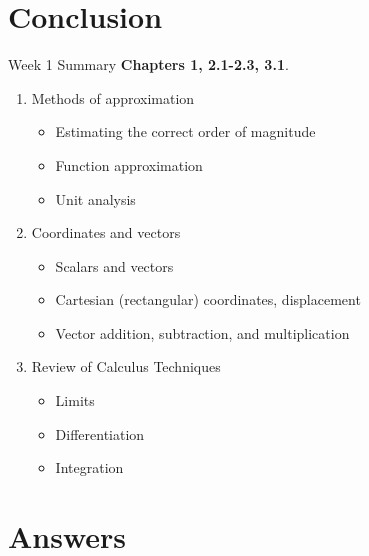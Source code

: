\documentclass{beamer}
\begin{document}
\section{Conclusion}

\begin{frame}{Week 1 Summary}
\textbf{Chapters 1, 2.1-2.3, 3.1}.
\begin{enumerate}
\item Methods of approximation
\begin{itemize}
\item \alert{Estimating} the correct order of magnitude
\item \alert{Function} approximation
\item \alert{Unit analysis}
\end{itemize}
\item Coordinates and vectors
\begin{itemize}
\item \alert{Scalars} and \alert{vectors}
\item \alert{Cartesian} (rectangular) coordinates, displacement
\item \alert{Vector} addition, subtraction, and multiplication
\end{itemize}
\item Review of Calculus Techniques
\begin{itemize}
\item Limits
\item Differentiation
\item Integration
\end{itemize}
\end{enumerate}
\end{frame}

\section{Answers}
\end{document}
